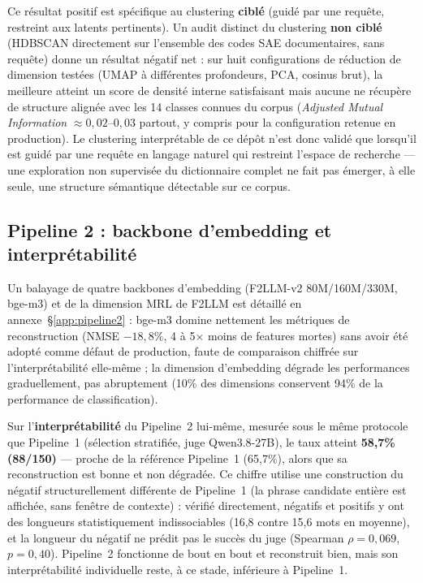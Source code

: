 \documentclass[11pt]{article}
\begin{document}
Ce résultat positif est spécifique au clustering \textbf{ciblé} (guidé par
une requête, restreint aux latents pertinents). Un audit distinct du
clustering \textbf{non ciblé} (HDBSCAN directement sur l'ensemble des codes
SAE documentaires, sans requête) donne un résultat négatif net : sur huit
configurations de réduction de dimension testées (UMAP à différentes
profondeurs, PCA, cosinus brut), la meilleure atteint un score de densité
interne satisfaisant mais aucune ne récupère de structure alignée avec les
14 classes connues du corpus (\emph{Adjusted Mutual Information}
$\approx 0,02$--$0,03$ partout, y compris pour la configuration retenue en
production). Le clustering interprétable de ce dépôt n'est donc validé que
lorsqu'il est guidé par une requête en langage naturel qui restreint
l'espace de recherche --- une exploration non supervisée du dictionnaire
complet ne fait pas émerger, à elle seule, une structure sémantique
détectable sur ce corpus.

\subsection{Pipeline 2 : backbone d'embedding et interprétabilité}
\label{subsec:pipeline2-scale}

Un balayage de quatre backbones d'embedding (F2LLM-v2 80M/160M/330M, bge-m3)
et de la dimension MRL de F2LLM est détaillé en annexe~\S\ref{app:pipeline2}
: bge-m3 domine nettement les métriques de reconstruction (NMSE $-18,8\%$,
4 à 5$\times$ moins de features mortes) sans avoir été adopté comme défaut de
production, faute de comparaison chiffrée sur l'interprétabilité elle-même ;
la dimension d'embedding dégrade les performances graduellement, pas abruptement (10\% des
dimensions conservent 94\% de la performance de classification).

Sur l'\textbf{interprétabilité} du Pipeline~2 lui-même, mesurée sous le même
protocole que Pipeline~1 (sélection stratifiée, juge Qwen3.8-27B), le taux
atteint \textbf{58,7\% (88/150)} --- proche de la référence Pipeline~1
(65,7\%), alors que sa reconstruction est bonne et non dégradée. Ce chiffre
utilise une construction du négatif structurellement différente de
Pipeline~1 (la phrase candidate entière est affichée, sans fenêtre de
contexte) : vérifié directement, négatifs et positifs
y ont des longueurs statistiquement indissociables (16,8 contre 15,6 mots en
moyenne),
et la longueur du négatif ne prédit pas le succès du juge (Spearman
$\rho=0,069$, $p=0,40$).
Pipeline~2 fonctionne de bout en bout et reconstruit bien, mais son
interprétabilité individuelle reste, à ce stade, inférieure à Pipeline~1.
\end{document}
